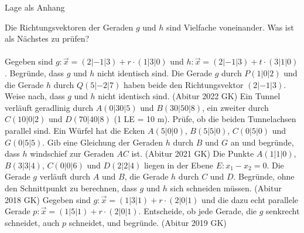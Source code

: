 \setcounter{aufgabe}{15}

\begin{aufgabe}{Lage als Anhang}
\begin{teile}
\teil Die Richtungsvektoren der Geraden $g$ und $h$ sind Vielfache voneinander. Was ist als Nächstes zu prüfen?  \\  \\ 
\teil Gegeben sind $g\colon \vec x = (2 | -1 | 3) + r \cdot (1 | 3 | 0)$ und $h\colon \vec x = (2 | -1 | 3) + t \cdot (3 | 1 | 0)$. Begründe, dass $g$ und $h$ nicht identisch sind.
\teil Die Gerade $g$ durch $P(1 | 0 | 2)$ und die Gerade $h$ durch $Q(5 | -2 | 7)$ haben beide den Richtungsvektor $(2 | -1 | 3)$. Weise nach, dass $g$ und $h$ nicht identisch sind. \hfill (Abitur 2022 GK)
\teil Ein Tunnel verläuft geradlinig durch $A(0 | 30 | 5)$ und $B(30 | 50 | 8)$, ein zweiter durch $C(10 | 0 | 2)$ und $D(70 | 40 | 8)$ (1 LE = 10 m). Prüfe, ob die beiden Tunnelachsen parallel sind.
\teil Ein Würfel hat die Ecken $A(5 | 0 | 0)$, $B(5 | 5 | 0)$, $C(0 | 5 | 0)$ und $G(0 | 5 | 5)$. Gib eine Gleichung der Geraden $h$ durch $B$ und $G$ an und begründe, dass $h$ windschief zur Geraden $AC$ ist. \hfill (Abitur 2021 GK)
\teil Die Punkte $A(1 | 1 | 0)$, $B(3 | 3 | 4)$, $C(0 | 0 | 6)$ und $D(2 | 2 | 4)$ liegen in der Ebene $E\colon x_1 - x_2 = 0$. Die Gerade $g$ verläuft durch $A$ und $B$, die Gerade $h$ durch $C$ und $D$. Begründe, ohne den Schnittpunkt zu berechnen, dass $g$ und $h$ sich schneiden müssen. \hfill (Abitur 2018 GK)
\teil Gegeben sind $g\colon \vec x = (1 | 3 | 1) + r \cdot (2 | 0 | 1)$ und die dazu echt parallele Gerade $p\colon \vec x = (1 | 5 | 1) + r \cdot (2 | 0 | 1)$. Entscheide, ob jede Gerade, die $g$ senkrecht schneidet, auch $p$ schneidet, und begründe. \hfill (Abitur 2019 GK)
\end{teile}
\end{aufgabe}

